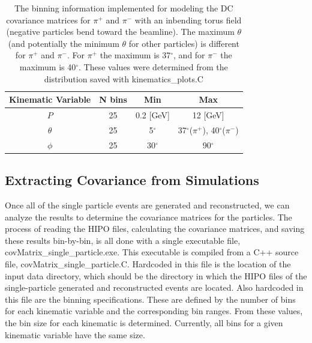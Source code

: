 \documentclass[showpacs,amsmath,amssymb,aps,prc,floatfix,showkeys,nofootinbib]{revtex4-1}
\begin{document}
\begin{table}[h!]
\centering
\caption{\label{tab:binning}The binning information implemented for modeling the DC covariance matrices for $\pi^+$ and $\pi^-$ with an inbending torus field (negative particles bend toward the beamline). The maximum $\theta$ (and potentially the minimum $\theta$ for other particles) is different for $\pi^+$ and $\pi^-$. For $\pi^+$ the maximum is 37$^\circ$, and for $\pi^-$ the maximum is 40$^\circ$. These values were determined from the distribution saved with kinematics\_plots.C}
\begin{tabular}{|c|c|c|c|}
\hline
Kinematic Variable & N bins & Min & Max \\
\hline
$P$ & 25 & 0.2 [GeV] & 12 [GeV] \\
$\theta$ & 25 & 5$^\circ$ & 37$^\circ$($\pi^+$), 40$^\circ$($\pi^-$) \\
$\phi$ & 25 & 30$^\circ$ & 90$^\circ$ \\
\hline
\end{tabular}
\end{table}

\subsection{\label{covMat}Extracting Covariance from Simulations}
Once all of the single particle events are generated and reconstructed, we can analyze the results to determine the covariance matrices for the particles. The process of reading the HIPO files, calculating the covariance matrices, and saving these results bin-by-bin, is all done with a single executable file, covMatrix\_single\_particle.exe. This executable is compiled from a C++ source file, covMatrix\_single\_particle.C. Hardcoded in this file is the location of the input data directory, which should be the directory in which the HIPO files of the single-particle generated and reconstructed events are located. Also hardcoded in this file are the binning specifications. These are defined by the number of bins for each kinematic variable and the corresponding bin ranges. From these values, the bin size for each kinematic is determined. Currently, all bins for a given kinematic variable have the same size.
\end{document}
